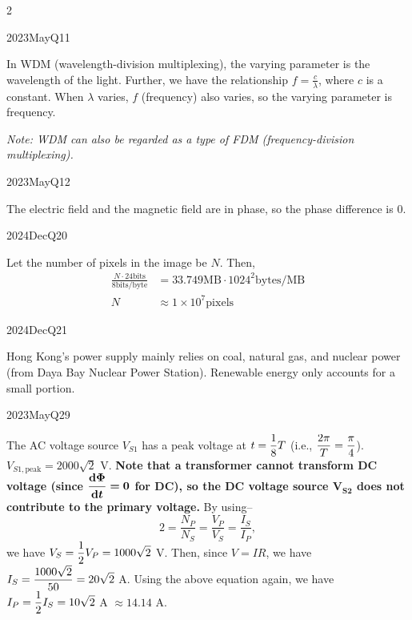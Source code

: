 \begin{multicols*}{2}
\begin{qsolution}{2023}{May}{Q11}{\tgElectronics \tgElectronicsMultiplexing}

    In WDM (wavelength-division multiplexing), the varying parameter is the wavelength of the light.
    Further, we have the relationship $\displaystyle f=\frac{c}{\lambda}$, where $c$ is a constant.
    When $\lambda$ varies, $f$ (frequency) also varies, so the varying parameter is frequency.

    {\itshape
        Note: WDM can also be regarded as a type of FDM (frequency-division multiplexing).
    }
\end{qsolution}

\begin{qsolution}[100]{2023}{May}{Q12}{\tgElectronics \tgElectronicsEM}

    The electric field and the magnetic field are in phase, so the phase difference is 0.
\end{qsolution}

\begin{qsolution}{2024}{Dec}{Q20}{\tgCE}

    Let the number of pixels in the image be $N$.
    Then, \begin{align*}
        \frac{N\cdot 24\mathrm{ bits}}{8\mathrm{ bits/byte}} &= 33.749\mathrm{ MB}\cdot 1024^2\mathrm{ bytes/MB}\\
        N &\approx 1\times10^7\mathrm{ pixels}
    \end{align*}
\end{qsolution}

\begin{qsolution}{2024}{Dec}{Q21}{\tgEE \tgEEPowerSystems}

    Hong Kong's power supply mainly relies on coal, natural gas, and nuclear power (from Daya Bay Nuclear Power Station).
    Renewable energy only accounts for a small portion.
\end{qsolution}

\begin{qsolution}{2023}{May}{Q29}{\tgEE \tgEETransformer}

    The AC voltage source $V_{S1}$ has a peak voltage at $\displaystyle t=\frac{1}{8}T$ (i.e., $\displaystyle \frac{2\pi}{T}=\frac{\pi}{4}$).
    $V_{S1,\mathrm{peak}}=2000\sqrt{2}$ V.
    \textbf{Note that a transformer cannot transform DC voltage (since $\displaystyle\bm{\frac{\mathrm{d}\Phi}{\mathrm{d}t}=0}$ for DC), so the DC voltage source $\bm{V_{S2}}$ does not contribute to the primary voltage.}
    By using-- \[2=\frac{N_P}{N_S}=\frac{V_P}{V_S}=\frac{I_S}{I_P},\] we have $\displaystyle V_S=\frac{1}{2}V_P=1000\sqrt{2}$ V.
    Then, since $V=IR$, we have $\displaystyle I_S=\frac{1000\sqrt{2}}{50}=20\sqrt{2}$ A.
    Using the above equation again, we have $\displaystyle I_P=\frac{1}{2}I_S=10\sqrt{2}$ A $\approx 14.14$ A.


\end{qsolution}
\end{multicols*}
